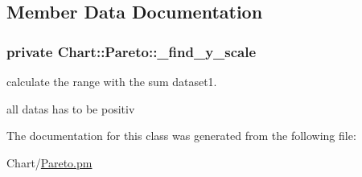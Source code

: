 \subsection{Member Data Documentation}
\hypertarget{classChart_1_1Pareto_aada3c837beb06c742e78aeb6f7e5c980}{
\subsubsection[{\_\-find\_\-y\_\-scale}]{\setlength{\rightskip}{0pt plus 5cm}private {\bf Chart::Pareto::\_\-find\_\-y\_\-scale}}}
\label{classChart_1_1Pareto_aada3c837beb06c742e78aeb6f7e5c980}


calculate the range with the sum dataset1. 

all datas has to be positiv 

The documentation for this class was generated from the following file:\begin{DoxyCompactItemize}
\item 
Chart/\hyperlink{Pareto_8pm}{Pareto.pm}\end{DoxyCompactItemize}
